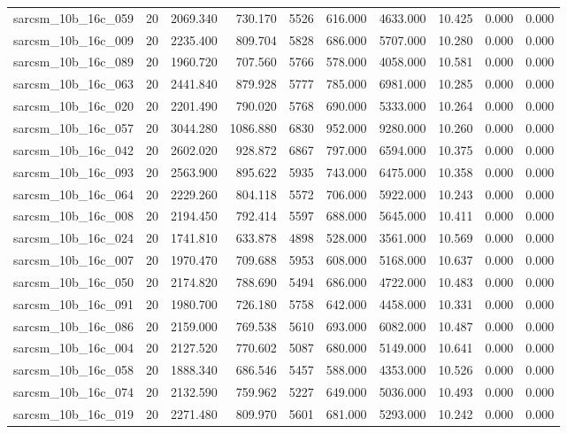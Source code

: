 \begin{tabular}{lrrrrrrrrr}
sarcsm\_10b\_16c\_059 & 20 & 2069.340 & 730.170 & 5526 & 616.000 & 4633.000 & 10.425 & 0.000 & 0.000 \\
sarcsm\_10b\_16c\_009 & 20 & 2235.400 & 809.704 & 5828 & 686.000 & 5707.000 & 10.280 & 0.000 & 0.000 \\
sarcsm\_10b\_16c\_089 & 20 & 1960.720 & 707.560 & 5766 & 578.000 & 4058.000 & 10.581 & 0.000 & 0.000 \\
sarcsm\_10b\_16c\_063 & 20 & 2441.840 & 879.928 & 5777 & 785.000 & 6981.000 & 10.285 & 0.000 & 0.000 \\
sarcsm\_10b\_16c\_020 & 20 & 2201.490 & 790.020 & 5768 & 690.000 & 5333.000 & 10.264 & 0.000 & 0.000 \\
sarcsm\_10b\_16c\_057 & 20 & 3044.280 & 1086.880 & 6830 & 952.000 & 9280.000 & 10.260 & 0.000 & 0.000 \\
sarcsm\_10b\_16c\_042 & 20 & 2602.020 & 928.872 & 6867 & 797.000 & 6594.000 & 10.375 & 0.000 & 0.000 \\
sarcsm\_10b\_16c\_093 & 20 & 2563.900 & 895.622 & 5935 & 743.000 & 6475.000 & 10.358 & 0.000 & 0.000 \\
sarcsm\_10b\_16c\_064 & 20 & 2229.260 & 804.118 & 5572 & 706.000 & 5922.000 & 10.243 & 0.000 & 0.000 \\
sarcsm\_10b\_16c\_008 & 20 & 2194.450 & 792.414 & 5597 & 688.000 & 5645.000 & 10.411 & 0.000 & 0.000 \\
sarcsm\_10b\_16c\_024 & 20 & 1741.810 & 633.878 & 4898 & 528.000 & 3561.000 & 10.569 & 0.000 & 0.000 \\
sarcsm\_10b\_16c\_007 & 20 & 1970.470 & 709.688 & 5953 & 608.000 & 5168.000 & 10.637 & 0.000 & 0.000 \\
sarcsm\_10b\_16c\_050 & 20 & 2174.820 & 788.690 & 5494 & 686.000 & 4722.000 & 10.483 & 0.000 & 0.000 \\
sarcsm\_10b\_16c\_091 & 20 & 1980.700 & 726.180 & 5758 & 642.000 & 4458.000 & 10.331 & 0.000 & 0.000 \\
sarcsm\_10b\_16c\_086 & 20 & 2159.000 & 769.538 & 5610 & 693.000 & 6082.000 & 10.487 & 0.000 & 0.000 \\
sarcsm\_10b\_16c\_004 & 20 & 2127.520 & 770.602 & 5087 & 680.000 & 5149.000 & 10.641 & 0.000 & 0.000 \\
sarcsm\_10b\_16c\_058 & 20 & 1888.340 & 686.546 & 5457 & 588.000 & 4353.000 & 10.526 & 0.000 & 0.000 \\
sarcsm\_10b\_16c\_074 & 20 & 2132.590 & 759.962 & 5227 & 649.000 & 5036.000 & 10.493 & 0.000 & 0.000 \\
sarcsm\_10b\_16c\_019 & 20 & 2271.480 & 809.970 & 5601 & 681.000 & 5293.000 & 10.242 & 0.000 & 0.000 \\

\end{tabular}

